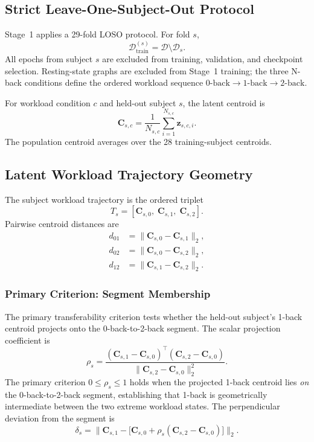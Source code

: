 \documentclass{ieeeaccess}
\begin{document}
\subsection{Strict Leave-One-Subject-Out Protocol}

Stage~1 applies a 29-fold LOSO protocol. For fold $s$,
\begin{equation}
  \mathcal{D}_{\mathrm{train}}^{(s)}
  = \mathcal{D} \setminus \mathcal{D}_s.
\end{equation}
All epochs from subject $s$ are excluded from training, validation, and
checkpoint selection. Resting-state graphs are excluded from Stage~1 training;
the three N-back conditions define the ordered workload sequence
$0\text{-back}\rightarrow1\text{-back}\rightarrow2\text{-back}$.

For workload condition $c$ and held-out subject $s$, the latent centroid is
\begin{equation}
  \mathbf{C}_{s,c}
  = \frac{1}{N_{s,c}}\sum_{i=1}^{N_{s,c}} \mathbf{z}_{s,c,i}.
\end{equation}
The population centroid averages over the 28 training-subject centroids.

\subsection{Latent Workload Trajectory Geometry}

The subject workload trajectory is the ordered triplet
\begin{equation}
  T_s = [\mathbf{C}_{s,0},\; \mathbf{C}_{s,1},\; \mathbf{C}_{s,2}].
\end{equation}
Pairwise centroid distances are
\begin{align}
  d_{01} &= \|\mathbf{C}_{s,0} - \mathbf{C}_{s,1}\|_2, \label{eq:d01}\\
  d_{02} &= \|\mathbf{C}_{s,0} - \mathbf{C}_{s,2}\|_2, \label{eq:d02}\\
  d_{12} &= \|\mathbf{C}_{s,1} - \mathbf{C}_{s,2}\|_2. \label{eq:d12}
\end{align}

\subsubsection{Primary Criterion: Segment Membership}
The primary transferability criterion tests whether the held-out subject's
1-back centroid projects onto the 0-back-to-2-back segment. The scalar
projection coefficient is
\begin{equation}
  \rho_s =
  \frac{(\mathbf{C}_{s,1} - \mathbf{C}_{s,0})^{\top}
        (\mathbf{C}_{s,2} - \mathbf{C}_{s,0})}
       {\|\mathbf{C}_{s,2} - \mathbf{C}_{s,0}\|_2^2}.
  \label{eq:rho}
\end{equation}
The primary criterion $0 \leq \rho_s \leq 1$ holds when the projected 1-back
centroid lies \emph{on} the 0-back-to-2-back segment, establishing that
1-back is geometrically intermediate between the two extreme workload states.
The perpendicular deviation from the segment is
\begin{equation}
  \delta_s =
  \bigl\|\mathbf{C}_{s,1}
  - \bigl[\mathbf{C}_{s,0}
    + \rho_s(\mathbf{C}_{s,2} - \mathbf{C}_{s,0})\bigr]\bigr\|_2.
\end{equation}
\end{document}
